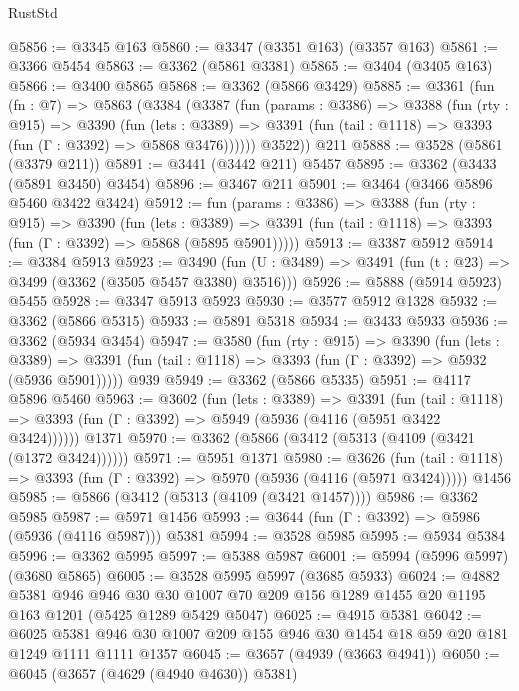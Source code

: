 \begin{lexlean}{RustStd}
\begin{coremodule}
@5856 := @3345 @163
@5860 := @3347 (@3351 @163) (@3357 @163)
@5861 := @3366 @5454
@5863 := @3362 (@5861 @3381)
@5865 := @3404 (@3405 @163)
@5866 := @3400 @5865
@5868 := @3362 (@5866 @3429)
@5885 := @3361
    (fun (fn : @7) =>
    @5863
      (@3384
        (@3387
          (fun (params : @3386) =>
          @3388
            (fun (rty : @915) =>
            @3390
              (fun (lets : @3389) =>
              @3391 (fun (tail : @1118) => @3393 (fun (Γ : @3392) => @5868 @3476))))))
        @3522))
    @211
@5888 := @3528 (@5861 (@3379 @211))
@5891 := @3441 (@3442 @211) @5457
@5895 := @3362 (@3433 (@5891 @3450) @3454)
@5896 := @3467 @211
@5901 := @3464 (@3466 @5896 @5460 @3422 @3424)
@5912 := fun (params : @3386) =>
  @3388
    (fun (rty : @915) =>
    @3390
      (fun (lets : @3389) =>
      @3391 (fun (tail : @1118) => @3393 (fun (Γ : @3392) => @5868 (@5895 @5901)))))
@5913 := @3387 @5912
@5914 := @3384 @5913
@5923 := @3490 (fun (U : @3489) => @3491 (fun (t : @23) => @3499 (@3362 (@3505 @5457 @3380) @3516)))
@5926 := @5888 (@5914 @5923) @5455
@5928 := @3347 @5913 @5923
@5930 := @3577 @5912 @1328
@5932 := @3362 (@5866 @5315)
@5933 := @5891 @5318
@5934 := @3433 @5933
@5936 := @3362 (@5934 @3454)
@5947 := @3580
    (fun (rty : @915) =>
    @3390
      (fun (lets : @3389) =>
      @3391 (fun (tail : @1118) => @3393 (fun (Γ : @3392) => @5932 (@5936 @5901)))))
    @939
@5949 := @3362 (@5866 @5335)
@5951 := @4117 @5896 @5460
@5963 := @3602
    (fun (lets : @3389) =>
    @3391
      (fun (tail : @1118) => @3393 (fun (Γ : @3392) => @5949 (@5936 (@4116 (@5951 @3422 @3424))))))
    @1371
@5970 := @3362 (@5866 (@3412 (@5313 (@4109 (@3421 (@1372 @3424))))))
@5971 := @5951 @1371
@5980 := @3626
    (fun (tail : @1118) => @3393 (fun (Γ : @3392) => @5970 (@5936 (@4116 (@5971 @3424)))))
    @1456
@5985 := @5866 (@3412 (@5313 (@4109 (@3421 @1457))))
@5986 := @3362 @5985
@5987 := @5971 @1456
@5993 := @3644 (fun (Γ : @3392) => @5986 (@5936 (@4116 @5987))) @5381
@5994 := @3528 @5985
@5995 := @5934 @5384
@5996 := @3362 @5995
@5997 := @5388 @5987
@6001 := @5994 (@5996 @5997) (@3680 @5865)
@6005 := @3528 @5995 @5997 (@3685 @5933)
@6024 := @4882
    @5381
    @946
    @946
    @30
    @30
    @1007
    @70
    @209
    @156
    @1289
    @1455
    @20
    @1195
    @163
    @1201
    (@5425 @1289 @5429 @5047)
@6025 := @4915 @5381
@6042 := @6025
    @5381
    @946
    @30
    @1007
    @209
    @155
    @946
    @30
    @1454
    @18
    @59
    @20
    @181
    @1249
    @1111
    @1111
    @1357
@6045 := @3657 (@4939 (@3663 @4941))
@6050 := @6045 (@3657 (@4629 (@4940 @4630)) @5381)

\end{coremodule}
\end{lexlean}
